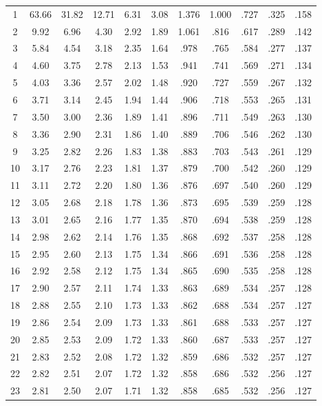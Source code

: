 \documentclass[12pt,a4paper]{article}
\begin{document}
\begin{enumerate}
\begin{center}
\begin{longtable}{c | ccccc | ccccc}
1 & 63.66 & 31.82 & 12.71 & 6.31 & 3.08 & 1.376 & 1.000 & .727 & .325 & .158 \\
2 & 9.92 & 6.96 & 4.30 & 2.92 & 1.89 & 1.061 & .816 & .617 & .289 & .142 \\
3 & 5.84 & 4.54 & 3.18 & 2.35 & 1.64 & .978 & .765 & .584 & .277 & .137 \\
4 & 4.60 & 3.75 & 2.78 & 2.13 & 1.53 & .941 & .741 & .569 & .271 & .134 \\
5 & 4.03 & 3.36 & 2.57 & 2.02 & 1.48 & .920 & .727 & .559 & .267 & .132 \\
6 & 3.71 & 3.14 & 2.45 & 1.94 & 1.44 & .906 & .718 & .553 & .265 & .131 \\
7 & 3.50 & 3.00 & 2.36 & 1.89 & 1.41 & .896 & .711 & .549 & .263 & .130 \\
8 & 3.36 & 2.90 & 2.31 & 1.86 & 1.40 & .889 & .706 & .546 & .262 & .130 \\
9 & 3.25 & 2.82 & 2.26 & 1.83 & 1.38 & .883 & .703 & .543 & .261 & .129 \\
10 & 3.17 & 2.76 & 2.23 & 1.81 & 1.37 & .879 & .700 & .542 & .260 & .129 \\
11 & 3.11 & 2.72 & 2.20 & 1.80 & 1.36 & .876 & .697 & .540 & .260 & .129 \\
12 & 3.05 & 2.68 & 2.18 & 1.78 & 1.36 & .873 & .695 & .539 & .259 & .128 \\
13 & 3.01 & 2.65 & 2.16 & 1.77 & 1.35 & .870 & .694 & .538 & .259 & .128 \\
14 & 2.98 & 2.62 & 2.14 & 1.76 & 1.35 & .868 & .692 & .537 & .258 & .128 \\
15 & 2.95 & 2.60 & 2.13 & 1.75 & 1.34 & .866 & .691 & .536 & .258 & .128 \\
16 & 2.92 & 2.58 & 2.12 & 1.75 & 1.34 & .865 & .690 & .535 & .258 & .128 \\
17 & 2.90 & 2.57 & 2.11 & 1.74 & 1.33 & .863 & .689 & .534 & .257 & .128 \\
18 & 2.88 & 2.55 & 2.10 & 1.73 & 1.33 & .862 & .688 & .534 & .257 & .127 \\
19 & 2.86 & 2.54 & 2.09 & 1.73 & 1.33 & .861 & .688 & .533 & .257 & .127 \\
20 & 2.85 & 2.53 & 2.09 & 1.72 & 1.33 & .860 & .687 & .533 & .257 & .127 \\
21 & 2.83 & 2.52 & 2.08 & 1.72 & 1.32 & .859 & .686 & .532 & .257 & .127 \\
22 & 2.82 & 2.51 & 2.07 & 1.72 & 1.32 & .858 & .686 & .532 & .256 & .127 \\
23 & 2.81 & 2.50 & 2.07 & 1.71 & 1.32 & .858 & .685 & .532 & .256 & .127 \\

\end{longtable}
\end{center}
\end{enumerate}
\end{document}
